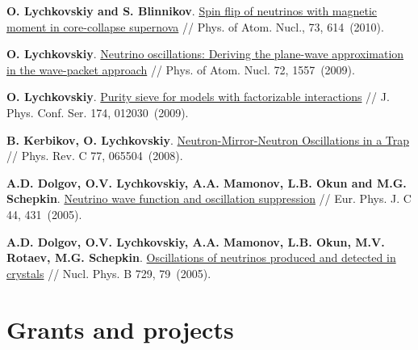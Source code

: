 \documentclass[10pt,a4paper,sans]{moderncv}
\begin{document}
	{\textbf{O. Lychkovskiy and S. Blinnikov}.
	{\textcolor{blue}{\href{http://dx.doi.org/10.1134/S106377881004006X}{Spin flip of neutrinos with magnetic moment in core-collapse supernova}}} //
Phys. of Atom. Nucl.,  73, 614~(2010).}

	{\textbf{O. Lychkovskiy}.
	{\textcolor{blue}{\href{http://dx.doi.org/10.1134/S1063778809090178}{Neutrino oscillations: Deriving the plane-wave approximation in the wave-packet approach}}} //
Phys. of Atom. Nucl.  72, 1557~(2009).}

	{\textbf{O. Lychkovskiy}.
	{\textcolor{blue}{\href{http://dx.doi.org/10.1088/1742-6596/174/1/012030}{Purity sieve for models with factorizable interactions}}} //
J. Phys. Conf. Ser.  174, 012030~(2009).}

	{\textbf{B. Kerbikov, O. Lychkovskiy}.
	{\textcolor{blue}{\href{http://dx.doi.org/10.1103/PhysRevC.77.065504}{Neutron-Mirror-Neutron Oscillations in a Trap}}} //
Phys. Rev. C  77, 065504~(2008).}

	{\textbf{A.D. Dolgov, O.V. Lychkovskiy, A.A. Mamonov, L.B. Okun and M.G. Schepkin}.
	{\textcolor{blue}{\href{http://dx.doi.org/10.1140/epjc/s2005-02369-7}{Neutrino wave  function and oscillation suppression}}} //
 Eur. Phys. J. C  44, 431~(2005).}

	{\textbf{A.D. Dolgov, O.V. Lychkovskiy, A.A. Mamonov, L.B. Okun, M.V. Rotaev, M.G. Schepkin}.
	{\textcolor{blue}{\href{http://dx.doi.org/10.1016/j.nuclphysb.2005.09.038}{Oscillations of neutrinos produced and detected in crystals}}} //
Nucl. Phys. B 729, 79~(2005).}

\section{Grants and projects}
\end{document}
